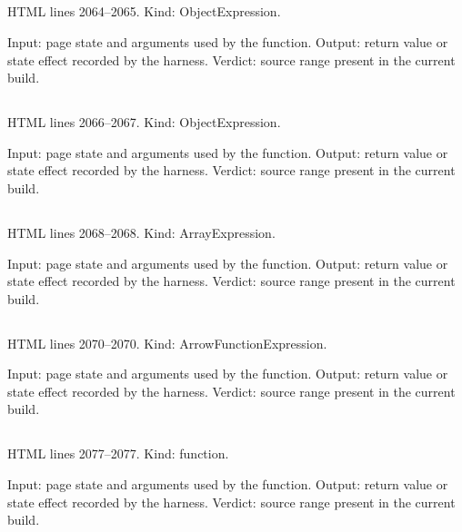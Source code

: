 \subsection*{\texttt{}}
\label{vf_15_ROLE_COLOURS}
HTML lines 2064--2065. Kind: ObjectExpression.

Input: page state and arguments used by the function.
Output: return value or state effect recorded by the harness.
Verdict: source range present in the current build.

\subsection*{\texttt{}}
\label{vf_16_ROLE_LINE}
HTML lines 2066--2067. Kind: ObjectExpression.

Input: page state and arguments used by the function.
Output: return value or state effect recorded by the harness.
Verdict: source range present in the current build.

\subsection*{\texttt{}}
\label{vf_17_PALETTE}
HTML lines 2068--2068. Kind: ArrayExpression.

Input: page state and arguments used by the function.
Output: return value or state effect recorded by the harness.
Verdict: source range present in the current build.

\subsection*{\texttt{}}
\label{vf_18_ce}
HTML lines 2070--2070. Kind: ArrowFunctionExpression.

Input: page state and arguments used by the function.
Output: return value or state effect recorded by the harness.
Verdict: source range present in the current build.

\subsection*{\texttt{}}
\label{vf_19_clone}
HTML lines 2077--2077. Kind: function.

Input: page state and arguments used by the function.
Output: return value or state effect recorded by the harness.
Verdict: source range present in the current build.

